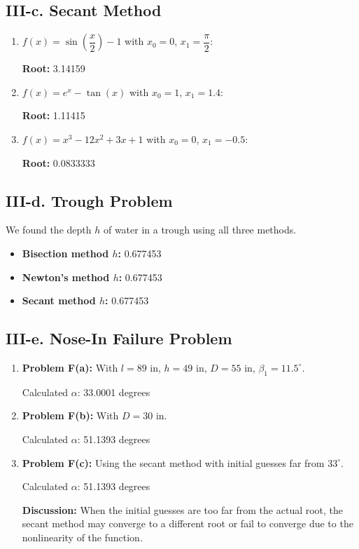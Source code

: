 \documentclass[a4paper]{article}
\begin{document}
\subsection*{III-c. Secant Method}

\begin{enumerate}
    \item $f(x) = \sin\left(\dfrac{x}{2}\right) - 1$ with $x_0 = 0$, $x_1 = \dfrac{\pi}{2}$:

    \textbf{Root:} 3.14159

    \item $f(x) = e^{x} - \tan(x)$ with $x_0 = 1$, $x_1 = 1.4$:

    \textbf{Root:} 1.11415

    \item $f(x) = x^3 - 12x^2 + 3x + 1$ with $x_0 = 0$, $x_1 = -0.5$:

    \textbf{Root:} 0.0833333
\end{enumerate}

\subsection*{III-d. Trough Problem}

We found the depth $h$ of water in a trough using all three methods.

\begin{itemize}
    \item \textbf{Bisection method $h$:} 0.677453
    \item \textbf{Newton's method $h$:} 0.677453
    \item \textbf{Secant method $h$:} 0.677453
\end{itemize}

\subsection*{III-e. Nose-In Failure Problem}

\begin{enumerate}
    \item \textbf{Problem F(a):} With $l = 89$ in, $h = 49$ in, $D = 55$ in, $\beta_1 = 11.5^\circ$.

    Calculated $\alpha$: 33.0001 degrees

    \item \textbf{Problem F(b):} With $D = 30$ in.

    Calculated $\alpha$: 51.1393 degrees

    \item \textbf{Problem F(c):} Using the secant method with initial guesses far from $33^\circ$.

    Calculated $\alpha$: 51.1393 degrees

    \textbf{Discussion:} When the initial guesses are too far from the actual root, the secant method may converge to a different root or fail to converge due to the nonlinearity of the function.
\end{enumerate}
\end{document}
